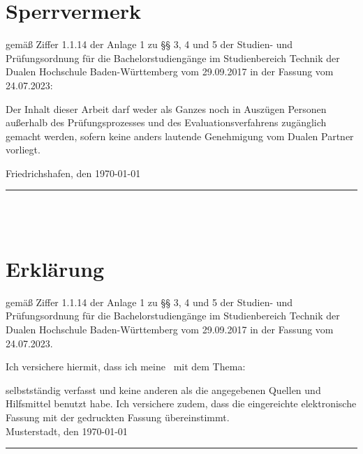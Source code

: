 \chapter*{Sperrvermerk} %
gemäß Ziffer 1.1.14 der Anlage 1 zu §§ 3, 4 und 5  der Studien- und Prüfungsordnung für die Bachelorstudiengänge im Studienbereich Technik der Dualen Hochschule Baden-Württemberg vom 29.09.2017 in der Fassung vom 24.07.2023:

Der Inhalt dieser Arbeit darf weder als Ganzes noch in Auszügen Personen außerhalb des Prüfungsprozesses und des Evaluationsverfahrens zugänglich gemacht werden, sofern keine anders lautende Genehmigung vom Dualen Partner vorliegt.

Friedrichshafen, den \today \\[4ex]

\rule[-0.2cm]{10cm}{0.5pt} \\

\textsc{\autor} \\[10ex]

\chapter*{Erklärung} %

gemäß Ziffer 1.1.14 der Anlage 1 zu §§ 3, 4 und 5  der Studien- und Prüfungsordnung für die Bachelorstudiengänge im Studienbereich Technik der Dualen Hochschule Baden-Württemberg vom 29.09.2017 in der Fassung vom 24.07.2023.

Ich versichere hiermit, dass ich meine \arbeit\ mit dem Thema:

\begin{quote}
	\textit{\titel} %
\end{quote}

selbstständig verfasst und keine anderen als die angegebenen Quellen und Hilfsmittel benutzt habe. Ich versichere zudem, dass die eingereichte elektronische Fassung mit der gedruckten Fassung übereinstimmt.\\[6ex]

Musterstadt, den \today \\[1ex]

\rule[-0.2cm]{5cm}{0.5pt} \\

\autor \\[10ex]

\rmfamily

\thispagestyle{empty}

